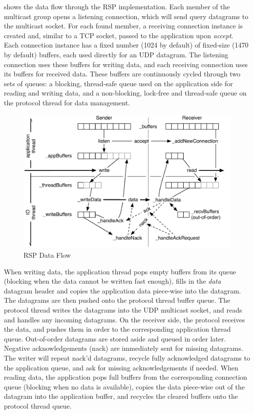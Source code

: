  shows the data flow through the RSP implementation. Each member of
the multicast group opens a listening connection, which will send query
datagrams to the multicast socket. For each found member, a receiving
connection instance is created and, similar to a TCP socket, passed to the
application upon {\em accept}. Each connection instance has a fixed number
(1024 by default) of fixed-size (1470 by default) buffers, each used directly
for an UDP datagram. The listening connection uses these buffers for writing
data, and each receiving connection uses its buffers for received data. These
buffers are continuously cycled through two sets of queues: a blocking,
thread-safe queue used on the application side for reading and writing data,
and a non-blocking, lock-free and thread-safe queue on the protocol thread for
data management.

\begin{figure}[h!t]\center
  \includegraphics[width=\textwidth]{images/rspPackets.pdf}
  {\caption{\label{fRSP}RSP Data Flow}}
\end{figure}

When writing data, the application thread pops empty buffers from its queue
(blocking when the data cannot be written fast enough), fills in the
{\em data} datagram header and copies the application data piece-wise into
the datagram. The datagrams are then pushed onto the protocol thread buffer
queue. The protocol thread writes the datagrams into the UDP multicast socket,
and reads and handles any incoming datagrams. On the receiver side, the protocol
receives the data, and pushes them in order to the corresponding application
thread queue. Out-of-order datagrams are stored aside and queued in order later.
Negative acknowledgements (nack) are immediately sent for missing
datagrams. The writer will repeat nack'd datagrams, recycle fully acknowledged
datagrams to the application queue, and ask for missing acknowledgements if
needed. When reading data, the application pops full buffers from the
corresponding connection queue (blocking when no data is available), copies
the data piece-wise out of the datagram into the application buffer, and recycles
the cleared buffers onto the protocol thread queue.

